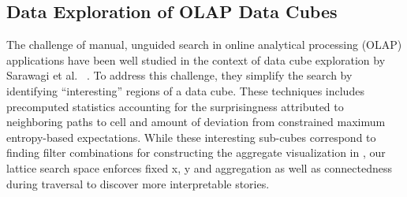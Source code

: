 \subsection{Data Exploration of OLAP Data Cubes} %
The challenge of manual, unguided search in online analytical processing (OLAP) applications have been well studied in the context of data cube exploration by Sarawagi et al. ~\cite{Sarawagi1999,Sarawagi2000,Sarawagi1998}. To address this challenge, they simplify the search by identifying ``interesting'' regions of a data cube. These techniques includes precomputed statistics accounting for the surprisingness attributed to neighboring paths to cell and amount of deviation from constrained maximum entropy-based expectations. While these interesting sub-cubes correspond to finding filter combinations for constructing the aggregate visualization in \system, our lattice search space enforces fixed x, y and aggregation as well as connectedness during traversal to discover more interpretable stories.

